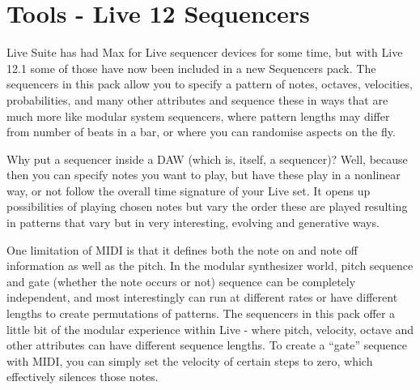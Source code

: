 \documentclass[
  12pt,
  letterpaper,
  oneside,
  open=any]{scrbook}
\begin{document}

\chapter{Tools - Live 12
Sequencers}\label{Chapter-031-Tools-Live12_Sequencers}

Live Suite has had Max for Live sequencer devices for some time, but
with Live 12.1 some of those have now been included in a new Sequencers
pack. The sequencers in this pack allow you to specify a pattern of
notes, octaves, velocities, probabilities, and many other attributes and
sequence these in ways that are much more like modular system
sequencers, where pattern lengths may differ from number of beats in a
bar, or where you can randomise aspects on the fly.

\begin{tcolorbox}[enhanced jigsaw, breakable, left=2mm, leftrule=.75mm, toprule=.15mm, opacitybacktitle=0.6, toptitle=1mm, coltitle=black, colback=white, colbacktitle=quarto-callout-tip-color!10!white, opacityback=0, rightrule=.15mm, bottomrule=.15mm, titlerule=0mm, title=\textcolor{quarto-callout-tip-color}{\faLightbulb}\hspace{0.5em}{Key idea}, arc=.35mm, bottomtitle=1mm, colframe=quarto-callout-tip-color-frame]

Why put a sequencer inside a DAW (which is, itself, a sequencer)? Well,
because then you can specify notes you want to play, but have these play
in a nonlinear way, or not follow the overall time signature of your
Live set. It opens up possibilities of playing chosen notes but vary the
order these are played resulting in patterns that vary but in very
interesting, evolving and generative ways.

One limitation of MIDI is that it defines both the note on and note off
information as well as the pitch. In the modular synthesizer world,
pitch sequence and gate (whether the note occurs or not) sequence can be
completely independent, and most interestingly can run at different
rates or have different lengths to create permutations of patterns. The
sequencers in this pack offer a little bit of the modular experience
within Live - where pitch, velocity, octave and other attributes can
have different sequence lengths. To create a ``gate'' sequence with
MIDI, you can simply set the velocity of certain steps to zero, which
effectively silences those notes.

\end{tcolorbox}
\end{document}
